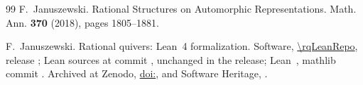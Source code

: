 \documentclass[a4paper,12pt,reqno]{amsart}
\theoremstyle{plain}
\theoremstyle{remark}
\begin{document}
\begin{thebibliography}{99}
      F.~Januszewski.
      \newblock Rational Structures on Automorphic Representations.
      \newblock Math. Ann. {\bf 370} (2018),
      pages 1805--1881.

      
      F.~Januszewski.
      \newblock Rational quivers: Lean~4 formalization.
      \newblock Software, \url{\rqLeanRepo}, release \texttt{\rqLeanTag}; Lean sources at commit \texttt{\rqLeanCommit}, unchanged in the release;
      Lean~\rqLeanToolchain, mathlib commit \texttt{\rqMathlibCommitShort}.
      \newblock Archived at Zenodo, \href{https://doi.org/\rqLeanDOI}{doi:\rqLeanDOI}, and Software Heritage, \texttt{\rqLeanSWHID}.

    \end{thebibliography}
\end{document}
